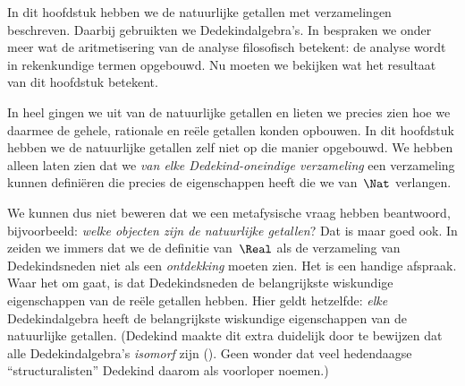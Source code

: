 \documentclass[../../../include/open-logic-section]{subfiles}
\begin{document}


In dit hoofdstuk hebben we de natuurlijke getallen met verzamelingen
beschreven. Daarbij gebruikten we Dedekindalgebra's. In
 bespraken we onder meer wat de aritmetisering
van de analyse filosofisch betekent: de analyse wordt in rekenkundige
termen opgebouwd. Nu moeten we bekijken wat het resultaat van dit
hoofdstuk betekent.

In heel  gingen we uit van de natuurlijke
getallen en lieten we precies zien hoe we daarmee de gehele, rationale
en reële getallen konden opbouwen. In dit hoofdstuk hebben we de
natuurlijke getallen zelf niet op die manier opgebouwd. We hebben
alleen laten zien dat we \emph{van elke Dedekind-oneindige verzameling}
een verzameling kunnen definiëren die precies de eigenschappen heeft die
we van~$\Nat$ verlangen.

We kunnen dus niet beweren dat we een metafysische vraag hebben
beantwoord, bijvoorbeeld: \emph{welke objecten zijn de natuurlijke
getallen}? Dat is maar goed ook. In
 zeiden we immers dat we de definitie
van~$\Real$ als de verzameling van Dedekindsneden niet als een
\emph{ontdekking} moeten zien. Het is een handige afspraak. Waar het om
gaat, is dat Dedekindsneden de belangrijkste wiskundige eigenschappen
van de reële getallen hebben. Hier geldt hetzelfde: \emph{elke}
Dedekindalgebra heeft de belangrijkste wiskundige eigenschappen van de
natuurlijke getallen. (Dedekind maakte dit extra duidelijk door te
bewijzen dat alle Dedekindalgebra's \emph{isomorf} zijn
(\citeyear[stellingen 132--3]{Dedekind1888}). Geen wonder dat veel
hedendaagse ``structuralisten'' Dedekind daarom als voorloper noemen.)
\end{document}
